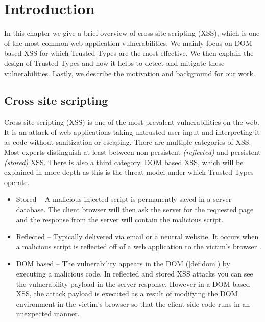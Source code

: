 \chapter{Introduction}
\label{chapter_intro}

In this chapter we give a brief overview of cross site scripting (XSS), which is one of the most
common web application vulnerabilities. We mainly focus on DOM based XSS for which Trusted Types are
the most effective. We then explain the design of Trusted Types and how it helps to detect and
mitigate these vulnerabilities. Lastly, we describe the motivation and background for our work.

\section{Cross site scripting}

Cross site scripting (XSS) is one of the most prevalent vulnerabilities on the web. It is an attack
of web applications taking untrusted user input and interpreting it as code without sanitization or
escaping. There are multiple categories of XSS. Most experts distinguish at least between
non persistent \emph{(reflected)} and persistent \emph{(stored)} XSS. There is also a third
category, DOM based XSS, which will be explained in more depth as this is the threat model
under which Trusted Types operate.

\begin{itemize}
  \item  Stored -- A malicious injected script is permanently saved in a server database. The client
        browser will then ask the server for the requested page and the response from the server
        will contain the malicious script.
  \item  Reflected -- Typically delivered via email or a neutral website. It occurs when a
        malicious script is reflected off of a web application to the victim's browser
        \cite{reflected_xss}.
  \item  DOM based -- The vulnerability appears in the DOM (\ref{def:dom}) by executing a malicious
        code. In reflected and stored XSS attacks you can see the vulnerability payload in the
        server response. However in a DOM based XSS, the attack payload is executed as a result of
        modifying the DOM environment in the victim's browser so that the client side code runs in
        an unexpected manner.
\end{itemize}

